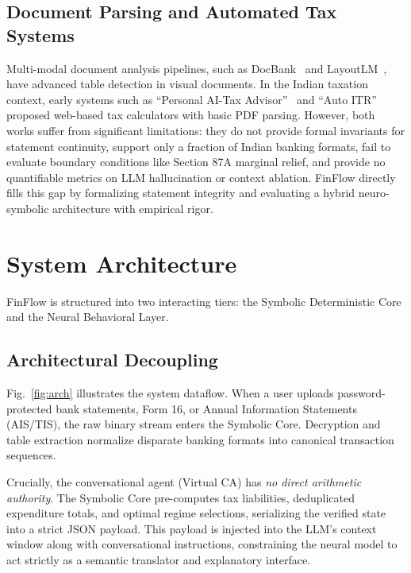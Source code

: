 \documentclass[conference]{IEEEtran}
\begin{document}
\subsection{Document Parsing and Automated Tax Systems}
Multi-modal document analysis pipelines, such as DocBank~\cite{li2020docbank} and LayoutLM~\cite{xu2020layoutlm}, have advanced table detection in visual documents. In the Indian taxation context, early systems such as ``Personal AI-Tax Advisor''~\cite{ijcrt2024taxadvisor} and ``Auto ITR''~\cite{ijert2024autoitr} proposed web-based tax calculators with basic PDF parsing. However, both works suffer from significant limitations: they do not provide formal invariants for statement continuity, support only a fraction of Indian banking formats, fail to evaluate boundary conditions like Section 87A marginal relief, and provide no quantifiable metrics on LLM hallucination or context ablation. FinFlow directly fills this gap by formalizing statement integrity and evaluating a hybrid neuro-symbolic architecture with empirical rigor.

\section{System Architecture}
\label{sec:architecture}
FinFlow is structured into two interacting tiers: the Symbolic Deterministic Core and the Neural Behavioral Layer.

\subsection{Architectural Decoupling}
Fig.~\ref{fig:arch} illustrates the system dataflow. When a user uploads password-protected bank statements, Form 16, or Annual Information Statements (AIS/TIS), the raw binary stream enters the Symbolic Core. Decryption and table extraction normalize disparate banking formats into canonical transaction sequences. 

Crucially, the conversational agent (Virtual CA) has \textit{no direct arithmetic authority}. The Symbolic Core pre-computes tax liabilities, deduplicated expenditure totals, and optimal regime selections, serializing the verified state into a strict JSON payload. This payload is injected into the LLM's context window along with conversational instructions, constraining the neural model to act strictly as a semantic translator and explanatory interface.
\end{document}
